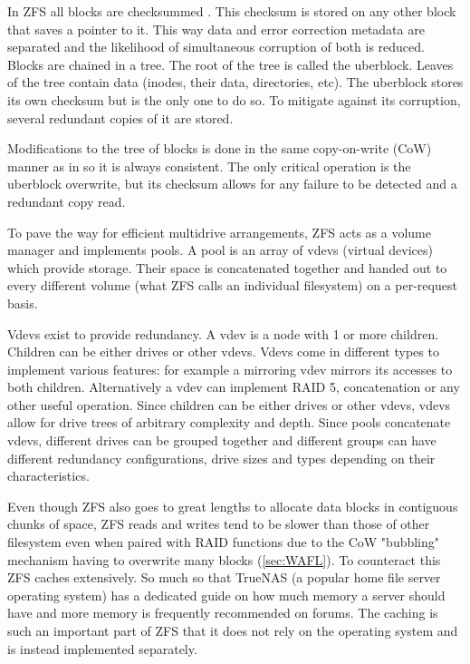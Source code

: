             In ZFS all blocks are checksummed \cite{ZFS}. This checksum is
            stored on any other block that saves a pointer to it. This way data
            and error correction metadata are separated and the likelihood of
            simultaneous corruption of both is reduced. Blocks are chained in a
            tree. The root of the tree is called the uberblock. Leaves of the
            tree contain data (inodes, their data, directories, etc). The
            uberblock stores its own checksum but is the only one to do so. To
            mitigate against its corruption, several redundant copies of it are
            stored.

            Modifications to the tree of blocks is done in the same
            copy-on-write (CoW) manner as in  so it is
            always consistent. The only critical operation is the uberblock
            overwrite, but its checksum allows for any failure to be detected
            and a redundant copy read.

            To pave the way for efficient multidrive arrangements, ZFS acts as
            a volume manager and implements pools. A pool is an array of vdevs
            (virtual devices) which provide storage. Their space is
            concatenated together and handed out to every different volume
            (what ZFS calls an individual filesystem) on a per-request basis.

            Vdevs exist to provide redundancy. A vdev is a node with 1 or more
            children. Children can be either drives or other vdevs. Vdevs come
            in different types to implement various features: for example a
            mirroring vdev mirrors its accesses to both children. Alternatively
            a vdev can implement RAID 5, concatenation or any other useful
            operation. Since children can be either drives or other vdevs,
            vdevs allow for drive trees of arbitrary complexity and depth.
            Since pools concatenate vdevs, different drives can be grouped
            together and different groups can have different redundancy
            configurations, drive sizes and types depending on their
            characteristics.

            Even though ZFS also goes to great lengths to allocate data blocks
            in contiguous chunks of space, ZFS reads and writes tend to be
            slower than those of other filesystem even when paired with RAID
            functions due to the CoW "bubbling" mechanism having to overwrite
            many blocks \cite{ZFS} (\autoref{sec:WAFL}). To counteract this ZFS
            caches extensively. So much so that TrueNAS (a popular home file
            server operating system) has a dedicated guide on how much memory a
            server should have \cite{TrueNAS_hardware_guide} and more memory is
            frequently recommended on forums. The caching is such an important
            part of ZFS that it does not rely on the operating system and is
            instead implemented separately.

